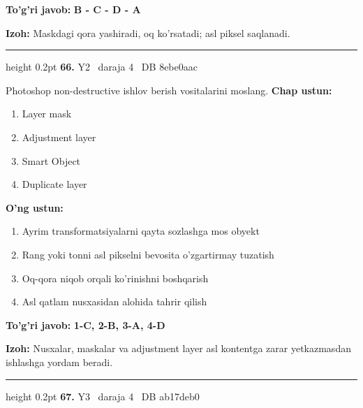 \documentclass[10pt,a4paper,oneside]{article}
\begin{document}
\begin{tcolorbox}[enhanced,breakable,colback=teal!4,colframe=teal!45!black,boxrule=0.45pt,arc=1.2mm,left=2.8mm,right=2.8mm,top=2mm,bottom=2mm,before skip=2mm,after skip=2mm]
\textbf{\color{teal}To'g'ri javob:} \textbf{B - C - D - A}
\par\smallskip
\textbf{Izoh:} Maskdagi qora yashiradi, oq ko'rsatadi; asl piksel saqlanadi.
\end{tcolorbox}
\vspace{2mm}\hrule height 0.2pt \vspace{4mm}
\hypertarget{q66}{\textbf{\color{ink}66.}}  {\color{muted}\scriptsize Y2 \textbullet\ daraja 4 \textbullet\ DB 8ebe0aac}
\par
Photoshop non-destructive ishlov berish vositalarini moslang.
\textbf{\footnotesize Chap ustun:}
\begin{enumerate}[label=\arabic*),leftmargin=9mm]
\item Layer mask
\item Adjustment layer
\item Smart Object
\item Duplicate layer
\end{enumerate}
\textbf{\footnotesize O'ng ustun:}
\begin{enumerate}[label=\Alph*),leftmargin=9mm]
\item Ayrim transformatsiyalarni qayta sozlashga mos obyekt
\item Rang yoki tonni asl pikselni bevosita o'zgartirmay tuzatish
\item Oq-qora niqob orqali ko'rinishni boshqarish
\item Asl qatlam nusxasidan alohida tahrir qilish
\end{enumerate}
\begin{tcolorbox}[enhanced,breakable,colback=teal!4,colframe=teal!45!black,boxrule=0.45pt,arc=1.2mm,left=2.8mm,right=2.8mm,top=2mm,bottom=2mm,before skip=2mm,after skip=2mm]
\textbf{\color{teal}To'g'ri javob:} \textbf{1-C, 2-B, 3-A, 4-D}
\par\smallskip
\textbf{Izoh:} Nusxalar, maskalar va adjustment layer asl kontentga zarar yetkazmasdan ishlashga yordam beradi.
\end{tcolorbox}
\vspace{2mm}\hrule height 0.2pt \vspace{4mm}
\hypertarget{q67}{\textbf{\color{ink}67.}}  {\color{muted}\scriptsize Y3 \textbullet\ daraja 4 \textbullet\ DB ab17deb0}
\end{document}
